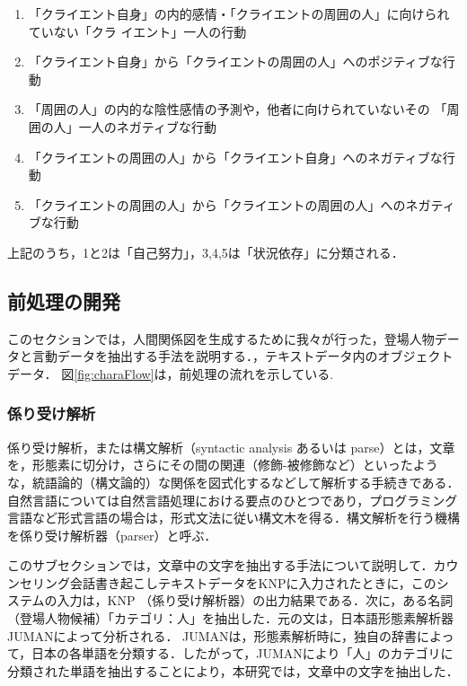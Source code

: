 \documentclass[shuuron]{kuee}
\begin{document}
\begin{enumerate}
  \item 「クライエント自身」の内的感情・「クライエントの周囲の人」に向けられていない「クラ
  イエント」一人の行動
  \item 「クライエント自身」から「クライエントの周囲の人」へのポジティブな行動


  \item 「周囲の人」の内的な陰性感情の予測や，他者に向けられていないその
  「周囲の人」一人のネガティブな行動
  \item 「クライエントの周囲の人」から「クライエント自身」へのネガティブな行動
  \item 「クライエントの周囲の人」から「クライエントの周囲の人」へのネガティブな行動

\end{enumerate}
上記のうち，1と2は「自己努力」，3,4,5は「状況依存」に分類される．


\subsection{前処理の開発}

このセクションでは，人間関係図を生成するために我々が行った，登場人物データと言動データを抽出する手法を説明する．，テキストデータ内のオブジェクトデータ． 図\ref{fig:charaFlow}は，前処理の流れを示している.








\subsubsection{係り受け解析}


係り受け解析，または構文解析（syntactic analysis あるいは parse）とは，文章を，形態素に切分け，さらにその間の関連（修飾-被修飾など）といったような，統語論的（構文論的）な関係を図式化するなどして解析する手続きである．自然言語については自然言語処理における要点のひとつであり，プログラミング言語など形式言語の場合は，形式文法に従い構文木を得る．構文解析を行う機構を係り受け解析器（parser）と呼ぶ．

このサブセクションでは，文章中の文字を抽出する手法について説明して．カウンセリング会話書き起こしテキストデータをKNPに入力されたときに，このシステムの入力は，KNP \cite{KNP}（係り受け解析器）の出力結果である．次に，ある名詞（登場人物候補）「カテゴリ：人」を抽出した．元の文は，日本語形態素解析器JUMAN\cite{juman}によって分析される． JUMANは，形態素解析時に，独自の辞書によって，日本の各単語を分類する．したがって，JUMANにより「人」のカテゴリに分類された単語を抽出することにより，本研究では，文章中の文字を抽出した．
\end{document}
